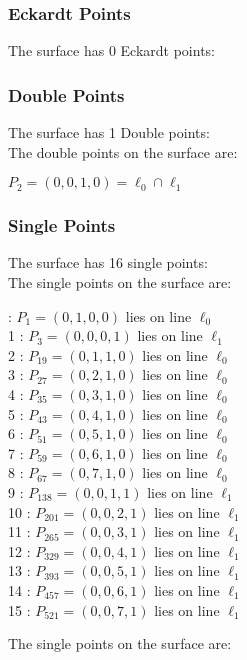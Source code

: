 \documentclass{article}
\begin{document}
{\subsubsection*{Eckardt Points}
The surface has 0 Eckardt points:\\
\subsubsection*{Double Points}
The surface has 1 Double points:\\
The double points on the surface are:\\
\begin{multicols}{2}
\noindent
$P_{2} = ( 0, 0, 1, 0 ) = \ell_{0} \cap \ell_{1} $\\
\end{multicols}
\subsubsection*{Single Points}
The surface has 16 single points:\\
The single points on the surface are:\\
\begin{multicols}{2}
 : $P_{1}=( 0, 1, 0, 0 )$ lies on line $\ell_{0}$\\
1 : $P_{3}=( 0, 0, 0, 1 )$ lies on line $\ell_{1}$\\
2 : $P_{19}=( 0, 1, 1, 0 )$ lies on line $\ell_{0}$\\
3 : $P_{27}=( 0, 2, 1, 0 )$ lies on line $\ell_{0}$\\
4 : $P_{35}=( 0, 3, 1, 0 )$ lies on line $\ell_{0}$\\
5 : $P_{43}=( 0, 4, 1, 0 )$ lies on line $\ell_{0}$\\
6 : $P_{51}=( 0, 5, 1, 0 )$ lies on line $\ell_{0}$\\
7 : $P_{59}=( 0, 6, 1, 0 )$ lies on line $\ell_{0}$\\
8 : $P_{67}=( 0, 7, 1, 0 )$ lies on line $\ell_{0}$\\
9 : $P_{138}=( 0, 0, 1, 1 )$ lies on line $\ell_{1}$\\
10 : $P_{201}=( 0, 0, 2, 1 )$ lies on line $\ell_{1}$\\
11 : $P_{265}=( 0, 0, 3, 1 )$ lies on line $\ell_{1}$\\
12 : $P_{329}=( 0, 0, 4, 1 )$ lies on line $\ell_{1}$\\
13 : $P_{393}=( 0, 0, 5, 1 )$ lies on line $\ell_{1}$\\
14 : $P_{457}=( 0, 0, 6, 1 )$ lies on line $\ell_{1}$\\
15 : $P_{521}=( 0, 0, 7, 1 )$ lies on line $\ell_{1}$\\
\end{multicols}
The single points on the surface are:\\
}
\end{document}
